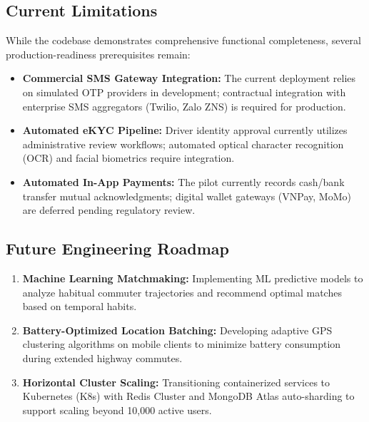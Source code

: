 \documentclass[conference,10pt,a4paper]{IEEEtran}
\begin{document}
\subsection{Current Limitations}
While the codebase demonstrates comprehensive functional completeness, several production-readiness prerequisites remain:
\begin{itemize}
    \item \textbf{Commercial SMS Gateway Integration:} The current deployment relies on simulated OTP providers in development; contractual integration with enterprise SMS aggregators (Twilio, Zalo ZNS) is required for production.
    \item \textbf{Automated eKYC Pipeline:} Driver identity approval currently utilizes administrative review workflows; automated optical character recognition (OCR) and facial biometrics require integration.
    \item \textbf{Automated In-App Payments:} The pilot currently records cash/bank transfer mutual acknowledgments; digital wallet gateways (VNPay, MoMo) are deferred pending regulatory review.
\end{itemize}

\subsection{Future Engineering Roadmap}
\begin{enumerate}
    \item \textbf{Machine Learning Matchmaking:} Implementing ML predictive models to analyze habitual commuter trajectories and recommend optimal matches based on temporal habits.
    \item \textbf{Battery-Optimized Location Batching:} Developing adaptive GPS clustering algorithms on mobile clients to minimize battery consumption during extended highway commutes.
    \item \textbf{Horizontal Cluster Scaling:} Transitioning containerized services to Kubernetes (K8s) with Redis Cluster and MongoDB Atlas auto-sharding to support scaling beyond 10,000 active users.
\end{enumerate}

\end{document}
